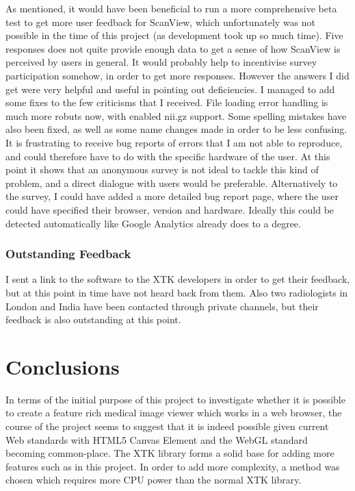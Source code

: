 \documentclass[a4paper,11pt,twoside]{article}
\begin{document}
 
As mentioned, it would have been beneficial to run a more comprehensive beta test to get more user feedback for ScanView, which unfortunately was not possible in the time of this project (as development took up so much time). Five responses does not quite provide enough data to get a sense of how ScanView is perceived by users in general. It would probably help to incentivise survey participation somehow, in order to get more responses. However the answers I did get were very helpful and useful in pointing out deficiencies. I managed to add some fixes to the few criticisms that I received. File loading error handling is much more robuts now, with enabled nii.gz support. Some spelling mistakes have also been fixed, as well as some name changes made in order to be less confusing. It is frustrating to receive bug reports of errors that I am not able to reproduce, and could therefore have to do with the specific hardware of the user. At this point it shows that an anonymous survey is not ideal to tackle this kind of problem, and a direct dialogue with users would be preferable. Alternatively to the survey, I could have added a more detailed bug report page, where the user could have specified their browser, version and hardware. Ideally this could be detected automatically like Google Analytics already does to a degree.


\subsubsection{Outstanding Feedback}

I sent a link to the software to the XTK developers in order to get their feedback, but at this point in time have not heard back from them. Also two radiologists in London and India have been contacted through private channels, but their feedback is also outstanding at this point.





\section{Conclusions}

In terms of the initial purpose of this project to investigate whether it is possible to create a feature rich medical image viewer which works in a web browser, the course of the project seems to suggest that it is indeed possible given current Web standards with HTML5 Canvas Element and the WebGL standard becoming common-place. The XTK library forms a solid base for adding more features such as in this project. In order to add more complexity, a method was chosen which requires more CPU power than the normal XTK library.
\end{document}
